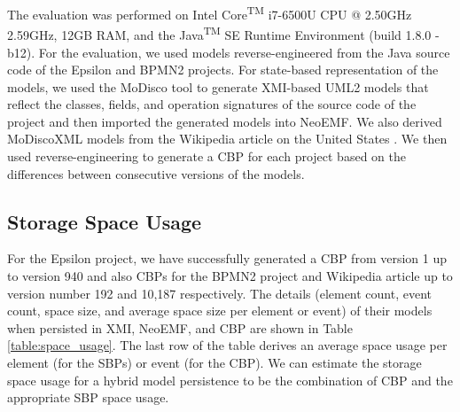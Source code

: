 \documentclass{llncs}
\begin{document}
\vspace{-10pt}
The evaluation was performed on Intel\textsuperscript{\textregistered} Core\textsuperscript{TM} i7-6500U CPU @ 2.50GHz 2.59GHz, 12GB RAM, and the Java\textsuperscript{TM} SE Runtime Environment (build 1.8.0 -b12). For the evaluation, we used models reverse-engineered from the Java source code of the Epsilon \cite{eclipse2017epsilon%
} and BPMN2 \cite{eclipse2017bpmn2} projects. For state-based representation of the models, we used the MoDisco tool \cite{DBLP:journals/infsof/BruneliereCDM14} to generate XMI-based UML2 %
models that reflect the classes, fields, and operation signatures of the source code of the project and then imported the generated models into NeoEMF. We also derived MoDiscoXML models \cite{eclipse2018modiscoxml} from the Wikipedia article on the United States \cite{wikipedia2018us}. We then used reverse-engineering to generate a CBP for each project based on the differences between consecutive versions of the models.

\vspace{-20pt}
\subsection{Storage Space Usage}
\label{sec:storage_space_usage}

\vspace{-20pt}
For the Epsilon project, we have successfully generated a CBP from version 1 up to version 940 and also CBPs for the BPMN2 project and Wikipedia article up to version number 192 and 10,187 respectively. The details (element count, event count, space size, and average space size per element or event) of their models when persisted in XMI, NeoEMF, and CBP are shown in Table \ref{table:space_usage}. The last row of the table derives an average space usage per element (for the SBPs) or event (for the CBP). We can estimate the storage space usage for a hybrid model persistence to be the combination of CBP and the appropriate SBP space usage.
\end{document}

